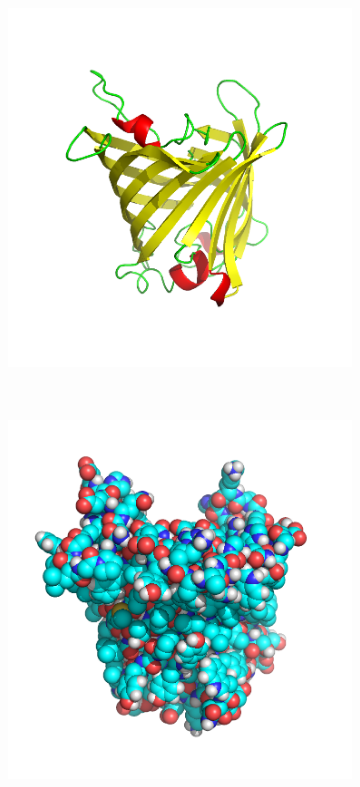 \begin{figure}
\begin{subfigure}{.5\textwidth}
  {\includegraphics[width=0.9\linewidth]{./figures/ch1/cartoon_representation}}    
    \label{Fig:cartoon_representation}
  \caption{}
  \end{subfigure}%
  \\[\baselineskip]
  \begin{subfigure}{.5\textwidth}
  \centering
  {\includegraphics[width=0.9\linewidth]{./figures/ch1/vdw_representation}}

\end{subfigure}
\end{figure}
